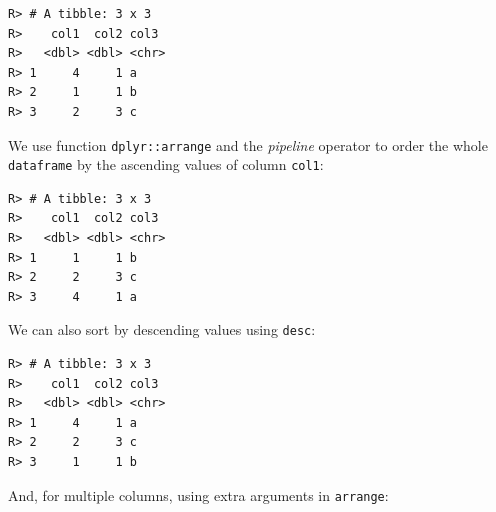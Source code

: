 \documentclass[
  12pt,
]{book}
\newenvironment{Shaded}{\begin{snugshade}}{\end{snugshade}}
\newcommand{\CommentTok}[1]{\textcolor[rgb]{0.37,0.37,0.37}{\textit{#1}}}
\newcommand{\KeywordTok}[1]{\textcolor[rgb]{0.27,0.27,0.27}{\textbf{#1}}}
\newcommand{\NormalTok}[1]{#1}
\newcommand{\OperatorTok}[1]{\textcolor[rgb]{0.43,0.43,0.43}{\textbf{#1}}}
\newcommand{\StringTok}[1]{\textcolor[rgb]{0.5,0.5,0.5}{#1}}
\begin{document}
\begin{verbatim}
R> # A tibble: 3 x 3
R>    col1  col2 col3 
R>   <dbl> <dbl> <chr>
R> 1     4     1 a    
R> 2     1     1 b    
R> 3     2     3 c
\end{verbatim}

We use function \texttt{dplyr::arrange} and the \emph{pipeline} operator to order the whole \texttt{dataframe} by the ascending values of column \texttt{col1}:

\begin{Shaded}
\end{Shaded}

\begin{verbatim}
R> # A tibble: 3 x 3
R>    col1  col2 col3 
R>   <dbl> <dbl> <chr>
R> 1     1     1 b    
R> 2     2     3 c    
R> 3     4     1 a
\end{verbatim}

We can also sort by descending values using \texttt{desc}:

\begin{Shaded}
\end{Shaded}

\begin{verbatim}
R> # A tibble: 3 x 3
R>    col1  col2 col3 
R>   <dbl> <dbl> <chr>
R> 1     4     1 a    
R> 2     2     3 c    
R> 3     1     1 b
\end{verbatim}

And, for multiple columns, using extra arguments in \texttt{arrange}:

\begin{Shaded}
\end{Shaded}
\end{document}

